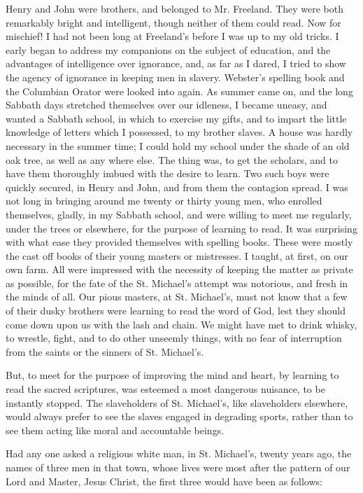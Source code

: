 Henry and John were brothers, and belonged to Mr. Freeland. They were
both remarkably bright and intelligent, though neither of them could
read. Now for mischief! I had not been long at Freeland's before I was
up to my old tricks. I early began to address my companions on the
subject of education, and the advantages of intelligence over ignorance,
and, as far as I dared, I tried to show the agency of ignorance in
keeping men in slavery. Webster's spelling book and the Columbian Orator
were looked into again. As summer came on, and the long Sabbath days
stretched themselves over our idleness, I became uneasy, and wanted a
Sabbath school, in which to exercise my gifts, and to impart the little
knowledge of letters which I possessed, to my brother slaves. A house
was hardly necessary in the summer time; I could hold my school under
the shade {}of an old oak tree, as well as any where else. The thing
was, to get the scholars, and to have them thoroughly imbued with the
desire to learn. Two such boys were quickly secured, in Henry and John,
and from them the contagion spread. I was not long in bringing around me
twenty or thirty young men, who enrolled themselves, gladly, in my
Sabbath school, and were willing to meet me regularly, under the trees
or elsewhere, for the purpose of learning to read. It was surprising
with what ease they provided themselves with spelling books. These were
mostly the cast off books of their young masters or mistresses. I
taught, at first, on our own farm. All were impressed with the necessity
of keeping the matter as private as possible, for the fate of the St.
Michael's attempt was notorious, and fresh in the minds of all. Our
pious masters, at St. Michael's, must not know that a few of their dusky
brothers were learning to read the word of God, lest they should come
down upon us with the lash and chain. We might have met to drink whisky,
to wrestle, fight, and to do other unseemly things, with no fear of
interruption from the saints or the sinners of St. Michael's.

But, to meet for the purpose of improving the mind and heart, by
learning to read the sacred scriptures, was esteemed a most dangerous
nuisance, to be instantly stopped. The slaveholders of St. Michael's,
like slaveholders elsewhere, would always prefer to see the slaves
engaged in degrading sports, rather than to see them acting like moral
and accountable beings.

Had any one asked a religious white man, in St. {}Michael's, twenty
years ago, the names of three men in that town, whose lives were most
after the pattern of our Lord and Master, Jesus Christ, the first three
would have been as follows:

